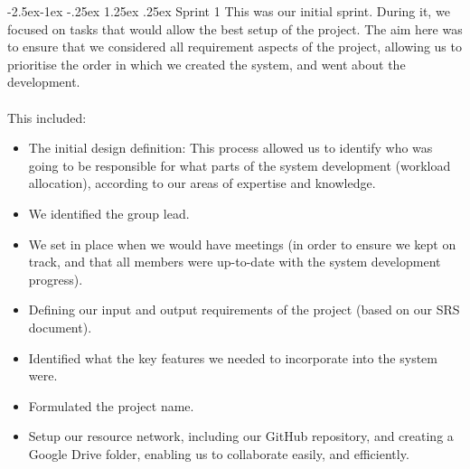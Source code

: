 \documentclass[paper=a4, fontsize=11pt]{scrartcl}
\makeatletter
\numberwithin{equation}{section}		%
\numberwithin{figure}{section}			%
\numberwithin{table}{section}				%
\renewcommand\paragraph{\@startsection{paragraph}{4}{\z@}%
            {-2.5ex\@plus -1ex \@minus -.25ex}%
            {1.25ex \@plus .25ex}%
            {\normalfont\normalsize\bfseries}}
\makeatother
\begin{document}
\paragraph{Sprint 1}
This was our initial sprint. During it, we focused on tasks that would allow the best setup of the project. The aim here was to ensure that we considered all requirement aspects of the project, allowing us to prioritise the order in which we created the system, and went about the development. \\\\This included:
\begin{itemize}
\item The initial design definition: This process allowed us to identify who was going to be responsible for what parts of the system development (workload allocation), according to our areas of expertise and knowledge.
\item We identified the group lead.
\item We set in place when we would have meetings (in order to ensure we kept on track, and that all members were up-to-date with the system development progress).
\item Defining our input and output requirements of the project (based on our SRS document).
\item Identified what the key features we needed to incorporate into the system were.
\item Formulated the project name.
\item Setup our resource network, including our GitHub repository, and creating a Google Drive folder, enabling us to collaborate easily, and efficiently.
\end{itemize}
\end{document}
